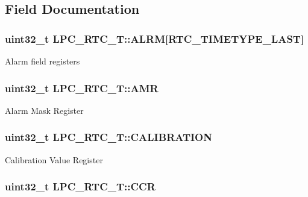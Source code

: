 \subsection{Field Documentation}
\hypertarget{structLPC__RTC__T_abeb0bd5d52ee9f40f515b9b007c7a832}{
\subsubsection[{A\-L\-R\-M}]{ uint32\-\_\-t L\-P\-C\-\_\-\-R\-T\-C\-\_\-\-T\-::\-A\-L\-R\-M\mbox{[}{\bf R\-T\-C\-\_\-\-T\-I\-M\-E\-T\-Y\-P\-E\-\_\-\-L\-A\-S\-T}\mbox{]}}}\label{structLPC__RTC__T_abeb0bd5d52ee9f40f515b9b007c7a832}
Alarm field registers \hypertarget{structLPC__RTC__T_af8b21ae5aa8bedcb0a1dd918678ee389}{
\subsubsection[{A\-M\-R}]{ uint32\-\_\-t L\-P\-C\-\_\-\-R\-T\-C\-\_\-\-T\-::\-A\-M\-R}}\label{structLPC__RTC__T_af8b21ae5aa8bedcb0a1dd918678ee389}
Alarm Mask Register \hypertarget{structLPC__RTC__T_ade5b98ca9e6ea8af2fd91e8a4f20503b}{
\subsubsection[{C\-A\-L\-I\-B\-R\-A\-T\-I\-O\-N}]{ uint32\-\_\-t L\-P\-C\-\_\-\-R\-T\-C\-\_\-\-T\-::\-C\-A\-L\-I\-B\-R\-A\-T\-I\-O\-N}}\label{structLPC__RTC__T_ade5b98ca9e6ea8af2fd91e8a4f20503b}
Calibration Value Register \hypertarget{structLPC__RTC__T_ab2117371a628879dbc56f2c1774207b5}{
\subsubsection[{C\-C\-R}]{ uint32\-\_\-t L\-P\-C\-\_\-\-R\-T\-C\-\_\-\-T\-::\-C\-C\-R}}\label{structLPC__RTC__T_ab2117371a628879dbc56f2c1774207b5}
